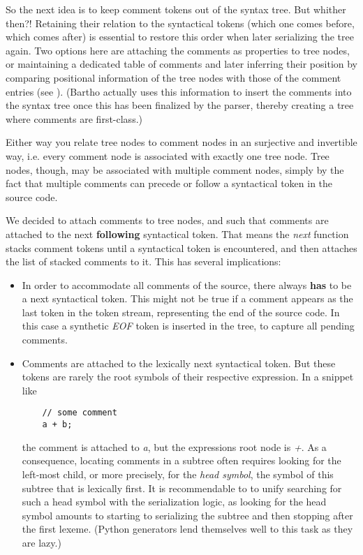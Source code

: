 \documentclass[11pt,a4paper]{article}
\begin{document}
So the next idea is to keep comment tokens out of the syntax tree. But whither
then?! Retaining their relation to the syntactical tokens (which one comes before,
which comes after) is essential to restore this order when later serializing the
tree again. Two options here are attaching the comments as properties to tree
nodes, or maintaining a dedicated table of comments and later inferring their
position by comparing positional information of the tree nodes with those of the
comment entries (see \cite{bartho-2009}). (Bartho actually uses this information
to insert the comments into the syntax tree once this has been finalized by the
parser, thereby creating a tree where comments are first-class.)

Either way you relate tree nodes to comment nodes in an surjective and
invertible way, i.e. every comment node is associated with exactly one tree
node. Tree nodes, though, may be associated with multiple comment nodes, simply
by the fact that multiple comments can precede or follow a syntactical token in
the source code.

We decided to attach comments to tree nodes, and such that comments are attached
to the next \textbf{following} syntactical token. That means the \textit{next}
function stacks comment tokens until a syntactical token is encountered,
and then attaches the list of stacked comments to it. This has several implications:

\begin{itemize}
\item In order to accommodate all comments of the source, there always
  \textbf{has} to be a next syntactical token. This might not be true if a
  comment appears as the last token in the token stream, representing the end of
  the source code. In this case a synthetic \textit{EOF} token is inserted in
  the tree, to capture all pending comments.
\item Comments are attached to the lexically next syntactical token. But these
  tokens are rarely the root symbols of their respective expression. In a
  snippet like \\
  \begin{verbatim}
    // some comment
    a + b;
  \end{verbatim}
  the comment is attached to \emph{a}, but the expressions root node is
  \emph{+}. As a consequence, locating comments in a subtree often requires
  looking for the left-most child, or more precisely, for the \emph{head
  symbol}, the symbol of this subtree that is lexically first. It is
  recommendable to to unify searching for such a head symbol with the
  serialization logic, as looking for the head symbol amounts to starting to
  serializing the subtree and then stopping after the first lexeme. (Python
  generators lend themselves well to this task as they are lazy.)
\end{itemize}
\end{document}
